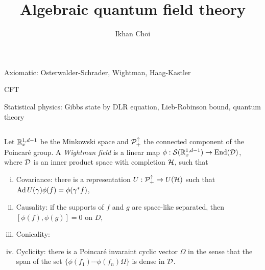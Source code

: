 \documentclass{../../large}
\begin{document}
\title{Algebraic quantum field theory}
\author{Ikhan Choi}
\maketitle
\tableofcontents



\chapter{}

Axiomatic: Osterwalder-Schrader, Wightman, Haag-Kastler

CFT

Statistical physics: Gibbs state by DLR equation, Lieb-Robinson bound, quantum theory


\section{}

\begin{prb}
Let $\mathbb{R}_x^{1,d-1}$ be the Minkowski space and $\mathcal{P}_+^\uparrow$ the connected component of the Poincar\'e group.
A \emph{Wightman field} is a linear map $\phi:\mathcal{S}(\mathbb{R}_x^{1,d-1})\to\operatorname{End}(\mathcal{D})$, where $\mathcal{D}$ is an inner product space with completion $\mathcal{H}$, such that
\begin{enumerate}[(i)]
\item Covariance: there is a representation $U:\mathcal{P}_+^\uparrow\to U(\mathcal{H})$ such that $\operatorname{Ad} U(\gamma)\phi(f)=\phi(\gamma^*f)$,
\item Causality: if the supports of $f$ and $g$ are space-like separated, then $[\phi(f),\phi(g)]=0$ on $D$,
\item Conicality: 
\item Cyclicity: there is a Poincar\'e invaraint cyclic vector $\Omega$ in the sense that the span of the set $\{\phi(f_1)\cdots\phi(f_n)\Omega\}$ is dense in $\mathcal{D}$.
\end{enumerate}
\end{prb}
\end{document}
